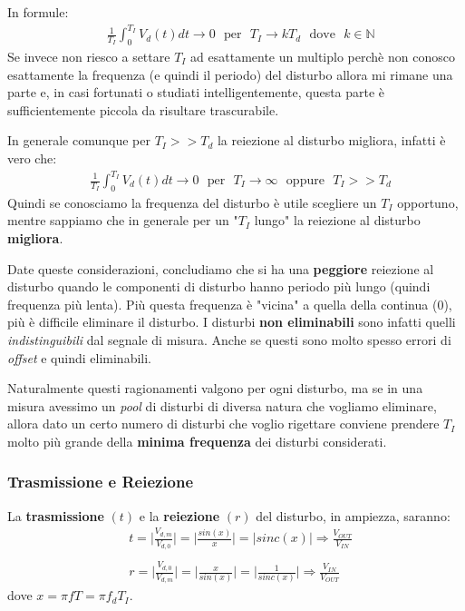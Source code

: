\documentclass[a4paper,11pt]{report}
\begin{document}
In formule:
\begin{align*}
  &\frac{1}{T_I}\int_0^{T_I}V_d(t)dt \rightarrow 0\text{~~per~~} T_I \rightarrow kT_d\text{~~dove~~} k \in \mathbb{N} 
\end{align*}
Se invece non riesco a settare $ T_I $ ad esattamente un multiplo perchè non conosco esattamente la frequenza (e quindi il periodo) del disturbo allora mi rimane una parte e, in casi fortunati o studiati intelligentemente, questa parte è sufficientemente piccola da risultare trascurabile.

In generale comunque per $ T_I >> T_d $ la reiezione al disturbo migliora, infatti è vero che:
\begin{align*}
    &\frac{1}{T_I}\int_0^{T_I}V_d(t)dt \rightarrow 0\text{~~per~~} T_I \rightarrow \infty\text{~~oppure~~} T_I >> T_d 
\end{align*}
Quindi se conosciamo la frequenza del disturbo è utile scegliere un $ T_I $ opportuno, mentre sappiamo che in generale per un "$ T_I $ lungo" la reiezione al disturbo \textbf{migliora}.

Date queste considerazioni, concludiamo che si ha una \textbf{peggiore} reiezione al disturbo quando le componenti di disturbo hanno periodo più lungo (quindi frequenza più lenta). Più questa frequenza è "vicina" a quella della continua (0), più è difficile eliminare il disturbo. I disturbi \textbf{non eliminabili} sono infatti quelli \textit{indistinguibili} dal segnale di misura. Anche se questi sono molto spesso errori di \textit{offset} e quindi eliminabili.

Naturalmente questi ragionamenti valgono per ogni disturbo, ma se in una misura avessimo un \textit{pool} di disturbi di diversa natura che vogliamo eliminare, allora dato un certo numero di disturbi che voglio rigettare conviene prendere $ T_I $ molto più grande della \textbf{minima frequenza} dei disturbi considerati.

\subsubsection{Trasmissione e Reiezione}
La \textbf{trasmissione} $ (t) $ e la \textbf{reiezione} $ (r) $ del disturbo, in ampiezza, saranno:
\begin{align*}
  &t = \Bigg|\frac{V_{d,m}}{V_{d,0}}\Bigg| = \Bigg|\frac{sin(x)}{x}\Bigg| = |sinc(x)| \Rightarrow \frac{V_{OUT}}{V_{IN}}\\
  \\
  &r = \Bigg|\frac{V_{d,0}}{V_{d,m}}\Bigg| = \Bigg|\frac{x}{sin(x)}\Bigg| = \Bigg|\frac{1}{sinc(x)}\Bigg| \Rightarrow \frac{V_{IN}}{V_{OUT}}
\end{align*}
dove $x = \pi f T = \pi f_d T_I$.\\
\end{document}
